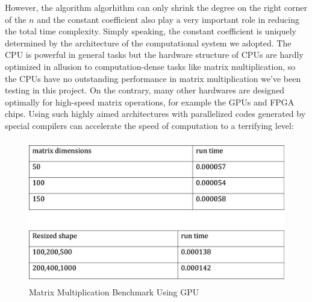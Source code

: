 \documentclass[UTF8]{ctexart}
\begin{document}
However, the algorithm algorhithm can only shrink the degree on the right corner of the \(n\) and the constant coefficient also play a very important role in reducing the total time complexity. Simply speaking, the constant coefficient is uniquely determined by the architecture of the computational system we adopted. The CPU is powerful in general tasks but the hardware structure of CPUs are hardly optimized in allusion to computation-dense tasks like matrix multiplication, so the CPUs have no outstanding performance in matrix multiplication we've been testing in this project. On the contrary, many other hardwares are designed optimally for high-speed matrix operations, for example the GPUs and FPGA chips. Using such highly aimed architectures with parallelized codes generated by special compilers can accelerate the speed of computation to a terrifying level:
\begin{figure}[htb]
  \begin{center}
    \includegraphics[height=6.3cm]{gpu_speed.jpg}
    \caption{Matrix Multiplication Benchmark Using GPU}
  \end{center}
\end{figure}



\end{document}
